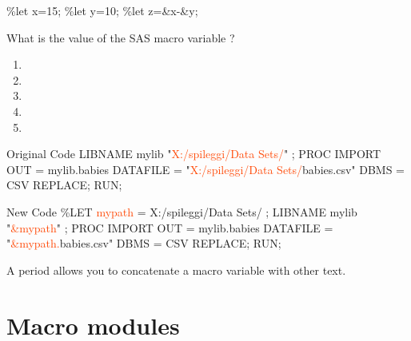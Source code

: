 \begin{frame}[fragile]
\footnotesize
\begin{code}{.0}
\%let x=15;
\%let y=10;
\%let z=\&x-\&y;
\end{code}
\emp
\vskip10pt
\begin{clicker}{What is the value of the SAS macro variable ?}
\begin{enumerate}
    \item {}
    \item {}
    \item {}
    \item {}
    \item {}
\end{enumerate}
\end{clicker}
\end{frame}


\begin{frame}[fragile]

\footnotesize
\begin{craw}{.0}{Original Code}
LIBNAME mylib "\textcolor{OrangeRed}{X:/spileggi/Data Sets/}" ;
PROC IMPORT OUT = mylib.babies
   DATAFILE = "\textcolor{OrangeRed}{X:/spileggi/Data Sets/}babies.csv"
   DBMS = CSV REPLACE;
RUN;
\end{craw}
\emp
\vskip10pt
\footnotesize
\begin{craw}{.0}{New Code}
\%LET \textcolor{OrangeRed}{mypath} = X:/spileggi/Data Sets/ ;
LIBNAME mylib "\textcolor{OrangeRed}{&mypath}" ;
PROC IMPORT OUT = mylib.babies
   DATAFILE = "\textcolor{OrangeRed}{&mypath.}babies.csv"
   DBMS = CSV REPLACE;
RUN;
\end{craw}
\emp
{} \hspace{1in} \emp
{}
A period allows you to concatenate a macro variable with other text.
\emp
\end{frame}

\section[Macro modules]{Macro modules}
\subsection{}
\begin{frame}
\end{frame}

